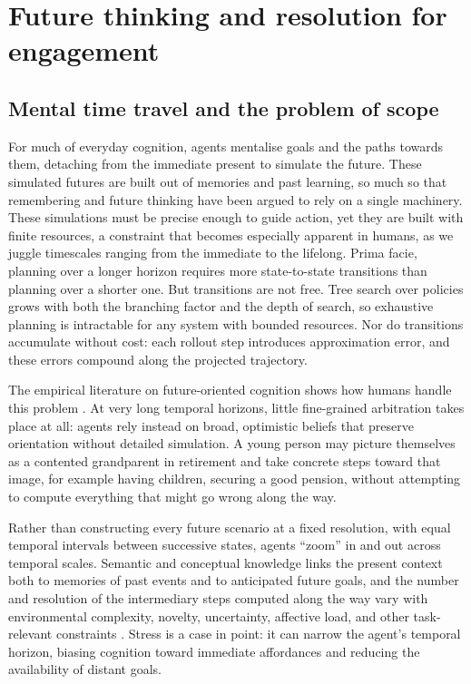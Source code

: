 \documentclass[11pt,a4paper]{article}
\begin{document}
\section{Future thinking and resolution for engagement}\label{sec:future_thinking}

\subsection{Mental time travel and the problem of scope}\label{sec:timetravel}
For much of everyday cognition, agents mentalise goals and the paths towards them, detaching from the immediate present to simulate the future. These simulated futures are built out of memories and past learning, so much so that remembering and future thinking have been argued to rely on a single machinery. These simulations must be precise enough to guide action, yet they are built with finite resources, a constraint that becomes especially apparent in humans, as we juggle timescales ranging from the immediate to the lifelong. Prima facie, planning over a longer horizon requires more state-to-state transitions than planning over a shorter one. But transitions are not free. Tree search over policies grows with both the branching factor and the depth of search, so exhaustive planning is intractable for any system with bounded resources. Nor do transitions accumulate without cost: each rollout step introduces approximation error, and these errors compound along the projected trajectory.

The empirical literature on future-oriented cognition shows how humans handle this problem \citep{schacteraddisbuckner2007, benedeketal2023}. At very long temporal horizons, little fine-grained arbitration takes place at all: agents rely instead on broad, optimistic beliefs that preserve orientation without detailed simulation. A young person may picture themselves as a contented grandparent in retirement and take concrete steps toward that image, for example having children, securing a good pension, without attempting to compute everything that might go wrong along the way. 


Rather than constructing every future scenario at a fixed resolution, with equal temporal intervals between successive states, agents ``zoom'' in and out across temporal scales. Semantic and conceptual knowledge links the present context both to memories of past events and to anticipated future goals, and the number and resolution of the intermediary steps computed along the way vary with environmental complexity, novelty, uncertainty, affective load, and other task-relevant constraints \citep{dargembeauvanderlinden2004, benedeketal2023}. Stress is a case in point: it can narrow the agent's temporal horizon, biasing cognition toward immediate affordances and reducing the availability of distant goals.
\end{document}
